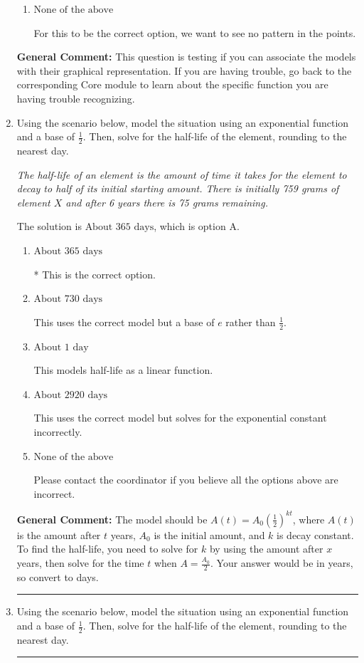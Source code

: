 \documentclass{extbook}[14pt]
\newcommand{\litem}[1]{\item #1

\rule{\textwidth}{0.4pt}}
\begin{document}
\begin{enumerate}
{\begin{enumerate}[label=\Alph*.]
For this to be the correct option, we need to see a polynomial or rational shape.
\item \( \text{None of the above} \)

For this to be the correct option, we want to see no pattern in the points.
\end{enumerate}

\textbf{General Comment:} This question is testing if you can associate the models with their graphical representation. If you are having trouble, go back to the corresponding Core module to learn about the specific function you are having trouble recognizing.
}
\litem{
Using the scenario below, model the situation using an exponential function and a base of $\frac{1}{2}$. Then, solve for the half-life of the element, rounding to the nearest day.

\begin{center}
    \textit{ The half-life of an element is the amount of time it takes for the element to decay to half of its initial starting amount. There is initially 759 grams of element $X$ and after 6 years there is 75 grams remaining. }
\end{center}
The solution is \( \text{About } 365 \text{ days} \), which is option A.\begin{enumerate}[label=\Alph*.]
\item \( \text{About } 365 \text{ days} \)

* This is the correct option.
\item \( \text{About } 730 \text{ days} \)

This uses the correct model but a base of $e$ rather than $\frac{1}{2}$.
\item \( \text{About } 1 \text{ day} \)

This models half-life as a linear function.
\item \( \text{About } 2920 \text{ days} \)

This uses the correct model but solves for the exponential constant incorrectly.
\item \( \text{None of the above} \)

Please contact the coordinator if you believe all the options above are incorrect.
\end{enumerate}

\textbf{General Comment:} The model should be $A(t) = A_0 (\frac{1}{2})^{kt}$, where $A(t)$ is the amount after $t$ years, $A_0$ is the initial amount, and $k$ is decay constant. To find the half-life, you need to solve for $k$ by using the amount after $x$ years, then solve for the time $t$ when $A = \frac{A_0}{2}$. Your answer would be in years, so convert to days.
}
\litem{
Using the scenario below, model the situation using an exponential function and a base of $\frac{1}{2}$. Then, solve for the half-life of the element, rounding to the nearest day.

}
\end{enumerate}
\end{document}
